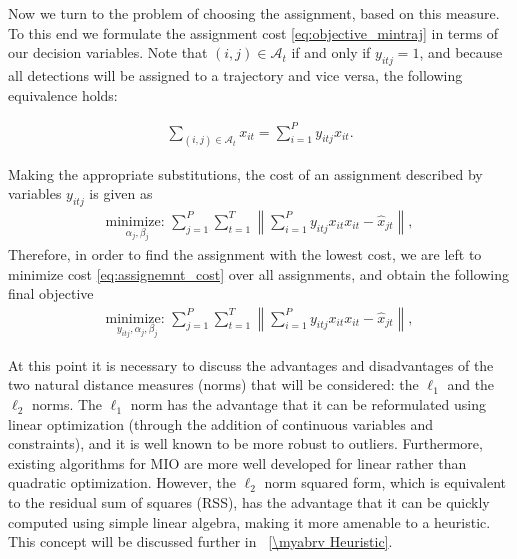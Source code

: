 Now we turn to the problem of choosing the assignment, based on this measure. To this end we formulate the assignment cost \eqref{eq:objective_mintraj} in terms of our decision variables. Note that $(i,j)\in\mathcal{A}_t$ if and only if $y_{itj}=1$, and because all detections will be assigned to a trajectory and vice versa, the following equivalence holds:

\begin{align}
\sum_{(i,j)\in \mathcal{A}_{t}} x_{it} = \sum_{i=1}^{P}y_{itj}x_{it}.
\end{align}

Making the appropriate substitutions, the cost of an assignment described by variables $y_{itj}$ is given as
\begin{align}\label{eq:assignemnt_cost}
 \underset{\alpha_{j}, \beta_{j}}{\text{minimize: }} \sum_{j=1}^{P} \sum_{t=1}^{T}  \left \| \sum_{i=1}^{P}y_{itj}x_{it} x_{it} - \hat{x}_{jt} \right \|,
\end{align}
Therefore, in order to find the assignment with the lowest cost, we are left to minimize cost \eqref{eq:assignemnt_cost} over all assignments, and obtain the following final objective 
\begin{align}\label{eq:full_objective}
 \underset{y_{itj}, \alpha_{j}, \beta_{j}}{\text{minimize: }} \sum_{j=1}^{P} \sum_{t=1}^{T}  \left \| \sum_{i=1}^{P}y_{itj}x_{it} x_{it} - \hat{x}_{jt} \right \|,
\end{align}


At this point it is necessary to discuss the advantages and disadvantages of the two natural distance measures (norms) that will be considered: the $\ell_1$ and the $\ell_2$ norms. The $\ell_1$ norm has the advantage that it can be reformulated using linear optimization (through the addition of continuous variables and constraints), and it is well known to be more robust to outliers. Furthermore, existing algorithms for MIO are more well developed for linear rather than quadratic optimization. However, the $\ell_2$ norm squared form, which is equivalent to the residual sum of squares (RSS), has the advantage that it can be quickly computed using simple linear algebra, making it more amenable to a heuristic. This concept will be discussed further in \mysection~\ref{\myabrv Heuristic}.

